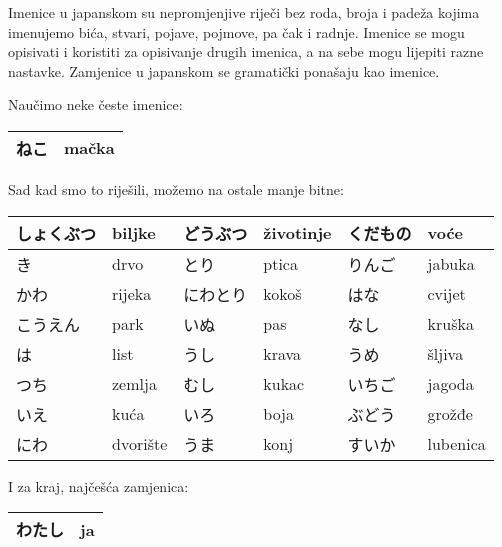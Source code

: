 
\author{Tomislav Mamić, Željka Ludošan}


	
	
	Imenice u japanskom su nepromjenjive riječi bez roda, broja i padeža kojima imenujemo bića, stvari, pojave, pojmove, pa čak i radnje. Imenice se mogu opisivati i koristiti za opisivanje drugih imenica, a na sebe mogu lijepiti razne nastavke. Zamjenice u japanskom se gramatički ponašaju kao imenice.

Naučimo neke česte imenice:
\vspace{10pt}

	\begin{tabular}{|l|l|}
		\hline
		ねこ&mačka\\\hline
	\end{tabular}
	\vspace{10pt}
	
	Sad kad smo to riješili, možemo na ostale manje bitne:
	
	\vspace{10pt}
	\begin{tabular}{|l|l|l|l|l|l|}
		\hline
		しょくぶつ&biljke&どうぶつ&životinje&くだもの&voće\\\hline
		き&drvo&とり&ptica&りんご&jabuka\\\hline
		かわ&rijeka&にわとり&kokoš&はな&cvijet\\\hline
		こうえん&park&いぬ&pas&なし&kruška\\\hline
		は&list&うし&krava&うめ&šljiva\\\hline
		つち&zemlja&むし&kukac&いちご&jagoda\\\hline
		いえ&kuća&いろ&boja&ぶどう&grožđe\\\hline
		にわ&dvorište&うま&konj&すいか&lubenica\\\hline
	\end{tabular}

	
	\vspace{10pt}
	I za kraj, najčešća zamjenica:
	
	\vspace{10pt}
	\begin{tabular}{|l|l|}
		\hline
		わたし&ja\\\hline
	\end{tabular}
	\vspace{10pt}

